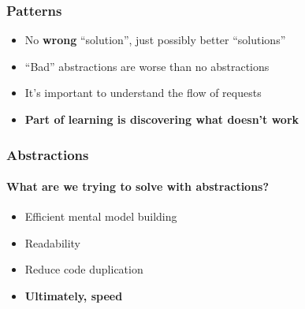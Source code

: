 
\begin{frame}[fragile]
  \frametitle{Patterns}
  \begin{itemize}
    \item No \textbf{wrong} ``solution'', just possibly better ``solutions''
    \pause
    \item ``Bad'' abstractions are worse than no abstractions
    \pause
    \item It's important to understand the flow of requests
    \pause
    \item \textbf{Part of learning is discovering what doesn't work}
  \end{itemize}
\end{frame}

{
  \color{solarizedBase2}
\begin{frame}[fragile]
  \frametitle{Abstractions}
  \framesubtitle{What are we trying to solve with abstractions?}

  \begin{itemize}
    \item Efficient mental model building
    \item Readability
    \item Reduce code duplication
    \item \textbf{Ultimately, speed}
  \end{itemize}
\end{frame}
}

